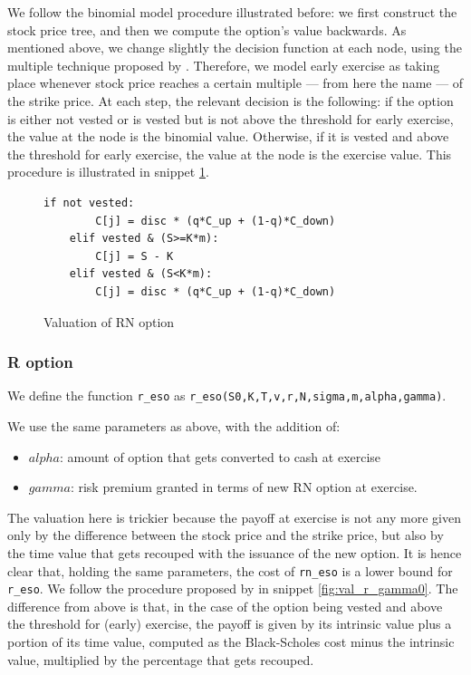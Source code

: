     
We follow the binomial model procedure illustrated before: we first construct the stock price tree, and then we compute the option's value backwards. As mentioned above, we change slightly the decision function at each node, using the multiple technique proposed by \citet{hull2004value}. Therefore, we model early exercise as taking place whenever stock price reaches a certain multiple --- from here the name --- of the strike price.
At each step, the relevant decision is the following: if the option is either not vested or is vested but is not above the threshold for early exercise, the value at the node is the binomial value. Otherwise, if it is vested and above the threshold for early exercise, the value at the node is the exercise value. This procedure is illustrated in snippet \ref*{fig:val_rn}.

\vspace*{15pt}
\begin{figure}[H]
    \begin{lstlisting}[breaklines, basicstyle=\ttfamily\small]
    if not vested: 
        C[j] = disc * (q*C_up + (1-q)*C_down)
    elif vested & (S>=K*m):            
        C[j] = S - K
    elif vested & (S<K*m):
        C[j] = disc * (q*C_up + (1-q)*C_down)
    \end{lstlisting}
    \caption{Valuation of RN option}
 \label{fig:val_rn}
\end{figure}
\vspace*{15pt}

\newpage
\subsubsection{R option}
We define the function \verb|r_eso| as \verb|r_eso(S0,K,T,v,r,N,sigma,m,alpha,gamma)|.
    


We use the same parameters as above, with the addition of:
\begin{itemize}
    \item $alpha$: amount of option that gets converted to cash at exercise
    \item $gamma$: risk premium granted in terms of new RN option at exercise. 
\end{itemize}

The valuation here is trickier because the payoff at exercise is not any more given only by the difference between the stock price and the strike price, but also by the time value that gets recouped with the issuance of the new option. It is hence clear that, holding the same parameters, the cost of \verb|rn_eso| is a lower bound for \verb|r_eso|. We follow the procedure proposed by \citet{huang2013dynamic} in snippet \ref*{fig:val_r_gamma0}. The difference from above is that, in the case of the option being vested and above the threshold for (early) exercise, the payoff is given by its intrinsic value plus a portion of its time value, computed as the Black-Scholes cost minus the intrinsic value, multiplied by the percentage that gets recouped. 

